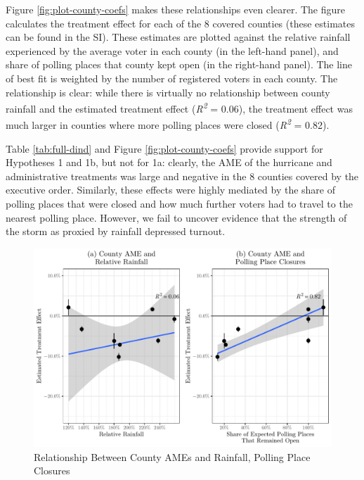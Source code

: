 \documentclass[
  12pt,
]{article}
\begin{document}
Figure \ref{fig:plot-county-coefs} makes these relationships even clearer. The figure calculates the treatment effect for each of the 8 covered counties (these estimates can be found in the SI). These estimates are plotted against the relative rainfall experienced by the average voter in each county (in the left-hand panel), and share of polling places that county kept open (in the right-hand panel). The line of best fit is weighted by the number of registered voters in each county. The relationship is clear: while there is virtually no relationship between county rainfall and the estimated treatment effect (\emph{R\textsuperscript{2}} = 0.06), the treatment effect was much larger in counties where more polling places were closed (\emph{R\textsuperscript{2}} = 0.82).

Table \ref{tab:full-dind} and Figure \ref{fig:plot-county-coefs} provide support for Hypotheses 1 and 1b, but not for 1a: clearly, the AME of the hurricane and administrative treatments was large and negative in the 8 counties covered by the executive order. Similarly, these effects were highly mediated by the share of polling places that were closed and how much further voters had to travel to the nearest polling place. However, we fail to uncover evidence that the strength of the storm as proxied by rainfall depressed turnout.

\newpage
\begin{landscape}
\begin{singlespace}

\end{singlespace}
\end{landscape}

\begin{figure}[H]

{\centering \includegraphics{hurricane_michael_files/figure-latex/rain-chunk-1} 

}

\caption{\label{fig:plot-county-coefs}Relationship Between County AMEs and Rainfall, Polling Place Closures}\label{fig:rain-chunk}
\end{figure}
\end{document}
